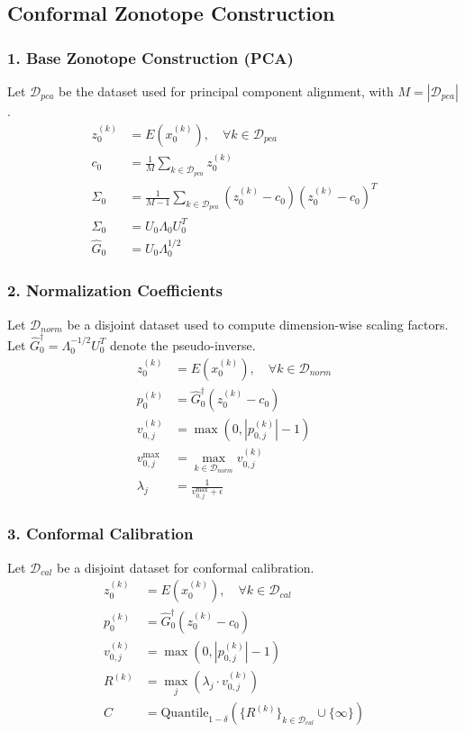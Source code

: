\subsection{Conformal Zonotope Construction}
\subsubsection*{1. Base Zonotope Construction (PCA)}
Let $\mathcal{D}_{pca}$ be the dataset used for principal component alignment, with $M = |\mathcal{D}_{pca}|$.
\begin{align*}
z_0^{(k)} &= E(x_0^{(k)}), \quad \forall k \in \mathcal{D}_{pca} \\
c_0 &= \frac{1}{M} \sum_{k \in \mathcal{D}_{pca}} z_0^{(k)} \\
\hat{\Sigma}_0 &= \frac{1}{M-1} \sum_{k \in \mathcal{D}_{pca}} (z_0^{(k)} - c_0)(z_0^{(k)} - c_0)^T \\
\hat{\Sigma}_0 &= U_0 \Lambda_0 U_0^T \\
\hat{G}_0 &= U_0 \Lambda_0^{1/2}
\end{align*}

\subsubsection*{2. Normalization Coefficients}
Let $\mathcal{D}_{norm}$ be a disjoint dataset used to compute dimension-wise scaling factors. Let $\hat{G}_0^\dagger = \Lambda_0^{-1/2} U_0^T$ denote the pseudo-inverse.
\begin{align*}
z_0^{(k)} &= E(x_0^{(k)}), \quad \forall k \in \mathcal{D}_{norm} \\
p_0^{(k)} &= \hat{G}_0^\dagger (z_0^{(k)} - c_0) \\
v_{0,j}^{(k)} &= \max\left(0, \left|p_{0,j}^{(k)}\right| - 1\right) \\
v_{0,j}^{\max} &= \max_{k \in \mathcal{D}_{norm}} v_{0,j}^{(k)} \\
\lambda_j &= \frac{1}{v_{0,j}^{\max} + \epsilon}
\end{align*}

\subsubsection*{3. Conformal Calibration}
Let $\mathcal{D}_{cal}$ be a disjoint dataset for conformal calibration.
\begin{align*}
z_0^{(k)} &= E(x_0^{(k)}), \quad \forall k \in \mathcal{D}_{cal} \\
p_0^{(k)} &= \hat{G}_0^\dagger (z_0^{(k)} - c_0) \\
v_{0,j}^{(k)} &= \max\left(0, \left|p_{0,j}^{(k)}\right| - 1\right) \\
R^{(k)} &= \max_j \left( \lambda_j \cdot v_{0,j}^{(k)} \right) \\
C &= \text{Quantile}_{1-\delta} \left( \{R^{(k)}\}_{k \in \mathcal{D}_{cal}} \cup \{\infty\} \right)
\end{align*}

